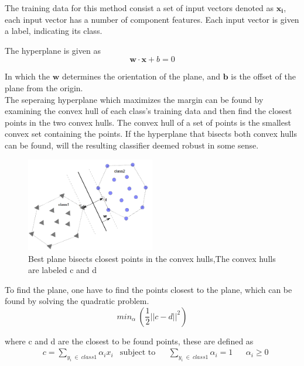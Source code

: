 The training data for this method consist a set of input vectors denoted as 
$\mathbf{x_i}$, each input vector has a number of component features. Each input 
vector is given a label, indicating its class.

The hyperplane is given as 
\begin{equation}
\mathbf{w} \cdot \mathbf{x} + b = 0
\end{equation}

In which the $\mathbf{w}$ determines the orientation of the plane, and 
$\mathbf{b}$ is the offset of the plane from the origin. \\
 
The seperaing hyperplane which maximizes the margin can be found by examining 
the convex hull of each class’s training data  and then find the closest points 
in the two convex hulls. The convex hull of a set of points is the
smallest convex set containing the points.  If the hyperplane that bisects both 
convex hulls can be found, will the resulting classifier deemed robust in some 
sense. 

\begin{figure}[H]
\centering
\includegraphics[width = 0.5\textwidth]{img/convex_hull.png}
\caption{Best plane bisects closest points in the convex hulls,The convex hulls 
are labeled c and d}
\label{fig::convex_hull}
\end{figure}  

To find  the plane, one have to find the points closest to the plane, which can 
be found by solving the quadratic problem. \\ 

\begin{equation}
min_\alpha~\left(\frac{1}{2} ||c-d||^2\right)
\end{equation}

where c and d are the closest to be found points, these are defined as 
\begin{equation}
\begin{aligned}
&c = \sum_{y_i~\in~class1} \alpha_ix_i  
& \text{subject to}
&& \sum_{y_i~\in~class1}\alpha_i =1 
&& \alpha_i \geq 0
\end{aligned} 
\end{equation}

